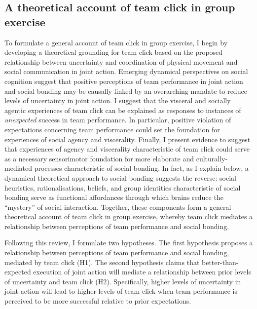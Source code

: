 \begin{CJK}{UTF8}{gbsn}




\section{A theoretical account of team click in group exercise}

To formulate a general account of team click in group exercise, I begin by developing a theoretical grounding for team click based on the proposed relationship between uncertainty and coordination of physical movement and social communication in joint action.  Emerging dynamical perspectives on social cognition suggest that positive perceptions of team performance in joint action and social bonding may be causally linked by an overarching mandate to reduce levels of uncertainty in joint action.  I suggest that the visceral and socially agentic experiences of team click can be explained as responses to instances of \textit{unexpected} success in team performance.  In particular, positive violation of expectations concerning team performance could set the foundation for experiences of social agency and viscerality.  Finally, I present evidence to suggest that experiences of agency and viscerality characteristic of team click could serve as a necessary sensorimotor foundation for more elaborate and culturally-mediated processes characteristic of social bonding.  In fact, as I explain below, a dynamical theoretical approach to social bonding suggests the reverse: social heuristics, rationalisations, beliefs, and group identities characteristic of social bonding serve as functional affordances through which brains reduce the ``mystery'' of social interaction.  Together, these components form a general theoretical account of team click in group exercise, whereby team click mediates a relationship between perceptions of team performance and social bonding.

Following this review, I formulate two hypotheses.  The first hypothesis proposes a relationship between perceptions of team performance and social bonding, mediated by team click (H1).  The second hypothesis claims that better-than-expected execution of joint action will mediate a relationship between prior levels of uncertainty and team click (H2).  Specifically, higher levels of uncertainty in joint action will lead to higher levels of team click when team performance is perceived to be more successful relative to prior expectations.



\end{CJK}
